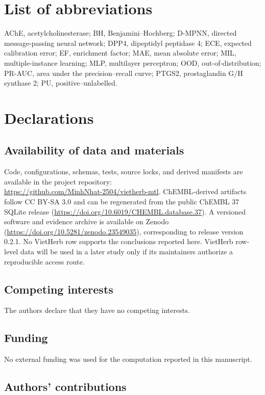 \documentclass[11pt]{article}
\begin{document}
\section*{List of abbreviations}

\noindent AChE, acetylcholinesterase; BH, Benjamini--Hochberg; D-MPNN, directed
message-passing neural network; DPP4, dipeptidyl peptidase 4; ECE, expected
calibration error; EF, enrichment factor; MAE, mean absolute error; MIL,
multiple-instance learning; MLP, multilayer perceptron; OOD,
out-of-distribution; PR-AUC, area under the precision--recall curve; PTGS2,
prostaglandin G/H synthase 2; PU, positive--unlabelled.

\section*{Declarations}

\subsection*{Availability of data and materials}

Code, configurations, schemas, tests, source locks, and derived manifests are
available in the project repository:\\
\url{https://github.com/MinhNhat-2504/vietherb-mtl}.
ChEMBL-derived artifacts follow CC BY-SA 3.0 and can be regenerated from the
public ChEMBL 37 SQLite release
(\url{https://doi.org/10.6019/CHEMBL.database.37}). A versioned software and
evidence archive is available on Zenodo
(\url{https://doi.org/10.5281/zenodo.23549035}), corresponding to release
version 0.2.1. No VietHerb row supports the conclusions reported here. VietHerb
row-level data will be used in a later study only if its maintainers authorize
a reproducible access route.

\subsection*{Competing interests}

The authors declare that they have no competing interests.

\subsection*{Funding}

No external funding was used for the computation reported in this manuscript.

\subsection*{Authors' contributions}
\end{document}
